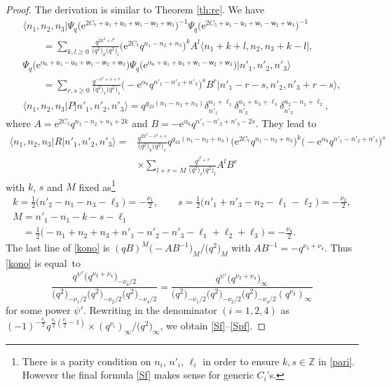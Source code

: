 \documentclass[pdftex]{sigma}
\newcommand{\Z}{{\mathbb Z}}
\newcommand{\e}{{\mathrm e}}
\newcommand{\uu}{{\mathsf u}}
\newcommand{\ww}{{\mathsf w}}
\numberwithin{equation}{section}
\begin{document}
\begin{proof}
The derivation is similar to Theorem \ref{th:re}.
We have
\begin{gather*}%
\langle n_1, n_2, n_3| \Psi_q\bigl(\e^{2C_7+\uu_1+\uu_3+\ww_1-\ww_2+\ww_3}\bigr)^{-1}\Psi_q\bigl(\e^{2C_5+\uu_1-\uu_3+\ww_1-\ww_2+\ww_3}\bigr)^{-1}
\nonumber\\
\qquad= \sum_{k,l\ge 0}\frac{q^{2k^2+l^2}}{\bigl(q^2\bigr)_k\bigl(q^2\bigr)_l}
\bigl(\e^{2C_7}q^{n_1-n_2+n_3}\bigr)^k A^l
\langle n_1+k+l, n_2, n_3+k-l|,
\\
\Psi_q\bigl(\e^{\alpha_6+\uu_1-\uu_3+\ww_1-\ww_2+\ww_3}\bigr) \Psi_q\bigl(\e^{\alpha_8+\uu_1+\uu_3+\ww_1-\ww_2+\ww_3}\bigr) \bigl| n'_1, n'_2, n'_3\bigr\rangle
\nonumber\\
\qquad=\sum_{r,s\ge 0}\frac{q^{-s^2+s+r}}{\bigl(q^2\bigr)_r\bigl(q^2\bigr)_s}
\bigl(-\e^{\alpha_8}q^{n'_1-n'_2+n'_3}\bigr)^s B^r
\bigl|n'_1-r-s, n'_2, n'_3+r-s\bigr\rangle,
\\
\langle n_1, n_2, n_3|P\bigl| n'_1, n'_2, n'_3\bigr\rangle
= q^{g_{23}(n_1-n_2+n_3)}\delta^{n_1+\ell_1}_{n'_1}
\delta^{n_1+n_3+\ell_3}_{n'_2}\delta^{n_2-n_1+\ell_2}_{n'_3},
\end{gather*}
where
$A=\e^{2C_5}q^{n_1-n_2+n_3+2k}$ and $B=-\e^{\alpha_6}q^{n'_1-n'_2+n'_3-2s}$.
They lead to
\begin{align}
\langle n_1, n_2, n_3| R\bigl| n'_1, n'_2, n'_3\bigr\rangle
 ={}& \frac{q^{2k^2-s^2+s}}{\bigl(q^2\bigr)_k\bigl(q^2\bigr)_s}q^{g_{23}(n_1-n_2+n_3)}
 \bigl(\e^{2C_7}q^{n_1-n_2+n_3}\bigr)^k\bigl(-\e^{\alpha_8}q^{n'_1-n'_2+n'_3}\bigr)^s
 \nonumber \\
 & \times \sum_{l+r=M}\frac{q^{l^2+r}}{\bigl(q^2\bigr)_r\bigl(q^2\bigr)_l}A^lB^r
 \label{kono}
\end{align}
with $k$, $s$ and $M$ fixed as\footnote{There is a parity condition on
 $n_i$, $n'_i$, $\ell_i$ in order to ensure $k, s \in \Z$ in
 \eqref{pari}. However the final formula \eqref{Sf} makes sense for
 generic $C_i$'s.}
\begin{gather}
k=\frac{1}{2}\bigl(n'_2-n_1-n_3-\ell_3\bigr)=-\frac{\nu_1}{2},
\qquad
s = \frac{1}{2}\bigl(n'_1+n'_3-n_2-\ell_1-\ell_2\bigr) = -\frac{\nu_2}{2},
\nonumber
\\
M = n'_1-n_1-k-s-\ell_1 \nonumber\\
\phantom{M }{} = \frac{1}{2}\bigl(-n_1+n_2+n_3+n'_1-n'_2-n'_3-\ell_1+\ell_2+\ell_3\bigr)
= -\frac{\nu_4}{2}.\label{pari}
\end{gather}
The last line of \eqref{kono} is
$(qB)^M\bigl(-AB^{-1}\bigr)_M/\bigl(q^2\bigr)_M$ with $AB^{-1}= -q^{\nu_3+\nu_4}$.
Thus \eqref{kono} is equal~to
\[
\frac{q^{\psi'}\bigl(q^{\nu_3+\nu_4}\bigr)_{-\nu_4/2}}
{\bigl(q^2\bigr)_{-\nu_1/2}\bigl(q^2\bigr)_{-\nu_2/2}\bigl(q^2\bigr)_{-\nu_4/2}}
= \frac{q^{\psi'}\bigl(q^{\nu_3+\nu_4}\bigr)_\infty}
{\bigl(q^2\bigr)_{-\nu_1/2}\bigl(q^2\bigr)_{-\nu_2/2}\bigl(q^2\bigr)_{-\nu_4/2}(q^{\nu_3})_\infty}
\]
for some power $\psi'$.
Rewriting  in the denominator $(i=1,2,4)$ as
$(-1)^{-\frac{\nu_i}{2}}q^{\frac{\nu_i}{2}(\frac{\nu_i}{2}-1)}\allowbreak\times(q^{\nu_i})_\infty/\bigl(q^2\bigr)_\infty$,
we obtain \eqref{Sf}--\eqref{Spf}.
\end{proof}
\end{document}
